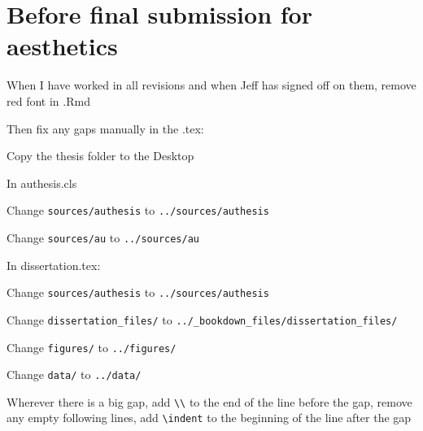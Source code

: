 \documentclass[12pt]{article}
\begin{document}
\section*{Before final submission for aesthetics}
	\begin{coi}
		\item When I have worked in all revisions and when Jeff has signed off on them, remove red font in .Rmd 
		\item Then fix any gaps manually in the .tex:
			\begin{coi}
				\item Copy the thesis folder to the Desktop
				\item In authesis.cls
					\begin{coi}
						\item Change \texttt{sources/authesis} to \texttt{../sources/authesis}
						\item Change \texttt{sources/au} to \texttt{../sources/au}
					\end{coi}
				\item In dissertation.tex:
					\begin{coi}
						\item Change \texttt{sources/authesis} to \texttt{../sources/authesis}
						\item Change \texttt{dissertation\_files/} to \texttt{../\_bookdown\_files/dissertation\_files/}
						\item Change \texttt{figures/} to \texttt{../figures/}
						\item Change \texttt{data/} to \texttt{../data/}
						\item Wherever there is a big gap, add \texttt{\textbackslash\textbackslash} to the end of the line before the gap, remove any empty following lines, add \texttt{\textbackslash indent} to the beginning of the line after the gap
					\end{coi}
			\end{coi}
	\end{coi}
\end{document}
